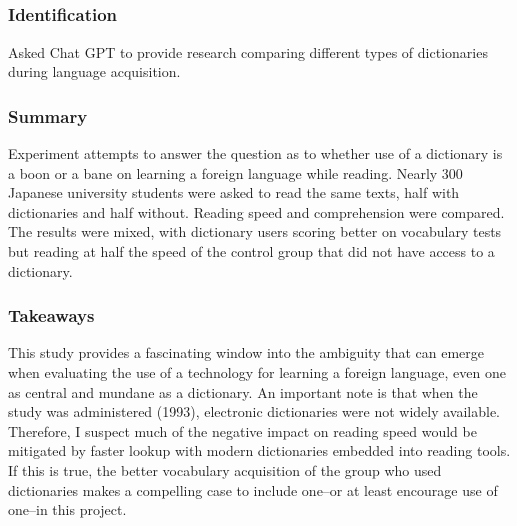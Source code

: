 \documentclass[
	letterpaper, %
]{jdf}
\begin{document}
\subsection{}
\subsubsection{Identification}
Asked Chat GPT to provide research comparing different types of dictionaries during language acquisition.

\subsubsection{Summary}
Experiment attempts to answer the question as to whether use of a dictionary is a boon or a bane on learning a foreign language while reading. Nearly 300 Japanese university students were asked to read the same texts, half with dictionaries and half without. Reading speed and comprehension were compared. The results were mixed, with dictionary users scoring better on vocabulary tests but reading at half the speed of the control group that did not have access to a dictionary.

\subsubsection{Takeaways}
This study provides a fascinating window into the ambiguity that can emerge when evaluating the use of a technology for learning a foreign language, even one as central and mundane as a dictionary. An important note is that when the study was administered (1993), electronic dictionaries were not widely available. Therefore, I suspect much of the negative impact on reading speed would be mitigated by faster lookup with modern dictionaries embedded into reading tools. If this is true, the better vocabulary acquisition of the group who used dictionaries makes a compelling case to include one–or at least encourage use of one–in this project.

\subsection{}
\end{document}
